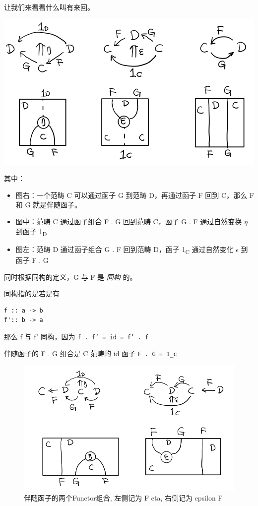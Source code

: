 \documentclass[letterspacing]{tufte-book}
\begin{document}
让我们来看看什么叫有来回。

\begin{center}
\includegraphics[width=.9\linewidth]{images/p1-adjunction-functor.png}
\end{center}

其中：

\begin{itemize}
\item 图右：一个范畴 C 可以通过函子 G 到范畴 D，再通过函子 F 回到 C，那么 F 和 G 就是伴随函子。
\item 图中：范畴 C 通过函子组合 F . G 回到范畴 C，函子 G . F 通过自然变换 \(\eta\) 到函子 1\textsubscript{D}
\item 图左：范畴 D 通过函子组合 G . F 回到范畴 D，函子 1\textsubscript{C} 通过自然变化 \(\epsilon\) 到函子 F . G
\end{itemize}

同时根据同构的定义，G 与 F 是 \emph{同构} 的。

同构指的是若是有
\lstset{language=haskell,label= ,caption= ,captionpos=b,numbers=none}
\begin{lstlisting}
f :: a -> b
f':: b -> a
\end{lstlisting}

那么 f 与 f' 同构，因为 \texttt{f . f' = id = f' . f}

伴随函子的 F . G 组合是 C 范畴的 id 函子 \texttt{F . G = 1\_c}

\begin{figure}[htbp]
\centering
\includegraphics[width=.9\linewidth]{images/p1-ajunction-functor-compose.png}
\caption{伴随函子的两个Functor组合, 左侧记为 F eta, 右侧记为 epsilon F}
\end{figure}
\end{document}
